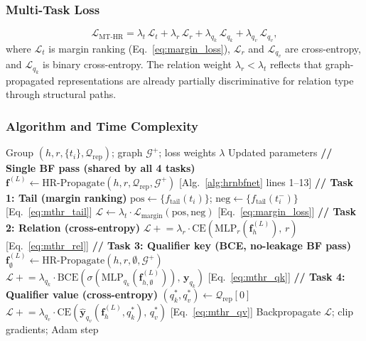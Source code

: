 \documentclass[10pt,journal,compsoc]{IEEEtran}
\begin{document}
\subsubsection{Multi-Task Loss}
\label{sssec:mthr_loss}

\begin{equation}
  \mathcal{L}_{\mathrm{MT\text{-}HR}}
  = \lambda_t\,\mathcal{L}_t
  + \lambda_r\,\mathcal{L}_r
  + \lambda_{q_k}\,\mathcal{L}_{q_k}
  + \lambda_{q_v}\,\mathcal{L}_{q_v},
  \label{eq:mthr_loss}
\end{equation}
where $\mathcal{L}_t$ is margin ranking
(Eq.~\ref{eq:margin_loss}), $\mathcal{L}_r$ and
$\mathcal{L}_{q_v}$ are cross-entropy,
and $\mathcal{L}_{q_k}$ is binary cross-entropy.
The relation weight $\lambda_r < \lambda_t$ reflects that
graph-propagated representations are already partially
discriminative for relation type through structural paths.

\subsubsection{Algorithm and Time Complexity}
\label{sssec:mthr_complexity}

\begin{algorithm}[t]
\caption{MT-HR-NBFNet: Training Step for Group $(h,r)$}
\label{alg:mthrnbfnet}
\begin{algorithmic}[1]
\Require Group $(h, r, \{t_i\}, \mathcal{Q}_{\mathrm{rep}})$;
  graph $\mathcal{G}^+$; loss weights $\lambda$
\Ensure Updated parameters
\State \textbf{// Single BF pass (shared by all 4 tasks)}
\State $\mathbf{f}^{(L)} \leftarrow
  \mathrm{HR\text{-}Propagate}(h, r,
  \mathcal{Q}_{\mathrm{rep}}, \mathcal{G}^+)$
  \hfill [Alg.~\ref{alg:hrnbfnet} lines 1--13]
\State \textbf{// Task 1: Tail (margin ranking)}
\State $\mathrm{pos} \leftarrow
  \{f_{\mathrm{tail}}(t_i)\}$;\;
  $\mathrm{neg} \leftarrow
  \{f_{\mathrm{tail}}(t^-_i)\}$
  \hfill [Eq.~\ref{eq:mthr_tail}]
\State $\mathcal{L} \leftarrow
  \lambda_t \cdot \mathcal{L}_{\mathrm{margin}}
  (\mathrm{pos}, \mathrm{neg})$
  \hfill [Eq.~\ref{eq:margin_loss}]
\State \textbf{// Task 2: Relation (cross-entropy)}
\State $\mathcal{L} \mathrel{+}=
  \lambda_r \cdot
  \mathrm{CE}(\mathrm{MLP}_r(\mathbf{f}_h^{(L)}),\, r)$
  \hfill [Eq.~\ref{eq:mthr_rel}]
  \State \textbf{// Task 3: Qualifier key (BCE, no-leakage BF pass)}
  \State $\mathbf{f}^{(L)}_\emptyset \leftarrow
    \mathrm{HR\text{-}Propagate}(h, r,
    \emptyset, \mathcal{G}^+)$
  \State $\mathcal{L} \mathrel{+}=
    \lambda_{q_k} \cdot
    \mathrm{BCE}(\sigma(\mathrm{MLP}_{q_k}
    (\mathbf{f}_{h,\emptyset}^{(L)})),\,
    \mathbf{y}_{q_k})$
    \hfill [Eq.~\ref{eq:mthr_qk}]
  \State \textbf{// Task 4: Qualifier value (cross-entropy)}
  \State $(q_k^*, q_v^*) \leftarrow
    \mathcal{Q}_{\mathrm{rep}}[0]$
  \State $\mathcal{L} \mathrel{+}=
    \lambda_{q_v} \cdot
    \mathrm{CE}(\hat{\mathbf{y}}_{q_v}
    (\mathbf{f}_h^{(L)}, q_k^*),\, q_v^*)$
    \hfill [Eq.~\ref{eq:mthr_qv}]
\EndIf
\State Backpropagate $\mathcal{L}$;\;
  clip gradients;\; Adam step
\end{algorithmic}
\end{algorithm}
\end{document}
